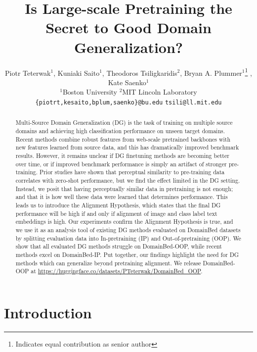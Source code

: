 \documentclass{article} %
\title{Is Large-scale Pretraining the Secret to Good Domain Generalization?}
\author{Piotr Teterwak$^1$,  Kuniaki Saito$^1$,  Theodoros Tsiligkaridis$^2$, Bryan A. Plummer$^1$\thanks{Indicates equal contribution as senior author} \hspace{0.05em} , Kate Saenko$^1$\footnotemark[1] \\
\hspace{80pt} $^1$Boston University \hspace{30pt} $^2$MIT Lincoln Laboratory\\
\texttt{\{piotrt,kesaito,bplum,saenko\}@bu.edu} \hspace{20pt} \texttt{tsili@ll.mit.edu} \\
}
\begin{document}
\maketitle

\begin{abstract}



Multi-Source Domain Generalization (DG) is the task of training on multiple source domains and achieving high classification performance on unseen target domains. Recent methods combine robust features from web-scale pretrained backbones with new features learned from source data, and this has dramatically improved benchmark results. However, it remains unclear if DG finetuning methods are becoming better over time, or if improved benchmark performance is simply an artifact of stronger pre-training.  Prior studies have shown that perceptual similarity to pre-training data correlates with zero-shot performance, but we find the effect limited in the DG setting. Instead, we posit that  having perceptually similar data in pretraining is not enough; and that it is how well these data were learned that determines performance. This leads us to introduce the Alignment Hypothesis, which states that the final DG performance will  be high if and only if alignment of image and class label text embeddings is high. Our experiments confirm the Alignment Hypothesis is true, and we use it as an analysis tool of existing DG methods evaluated on DomainBed datasets by splitting evaluation data into In-pretraining (IP) and Out-of-pretraining (OOP). We show that all evaluated DG methods struggle on DomainBed-OOP, while recent methods excel on DomainBed-IP. Put together, our findings highlight the need for DG methods which can generalize beyond pretraining alignment. We release DomainBed-OOP at \url{https://huggingface.co/datasets/PTeterwak/DomainBed_OOP}. 







\end{abstract}


\section{Introduction}
\end{document}
